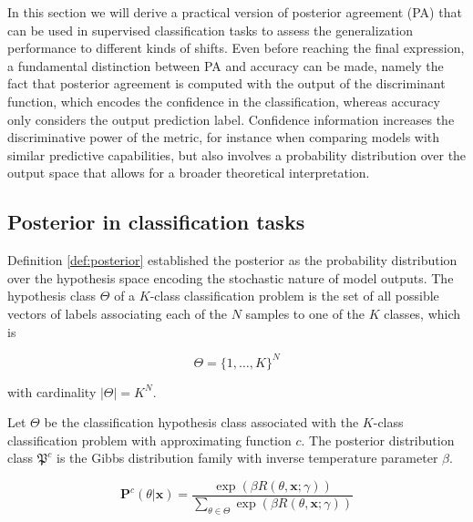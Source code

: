 In this section we will derive a practical version of posterior agreement (PA) that
can be used in supervised classification tasks to assess the generalization performance
to different kinds of shifts. Even before reaching the final expression, a 
fundamental distinction between PA and accuracy can be made, namely the fact
that posterior agreement is computed with the output of the discriminant function,
which encodes the confidence in the classification, whereas accuracy only
considers the output prediction label. Confidence information increases 
the discriminative power of the metric, for instance when
comparing models with similar predictive capabilities, but also involves a probability
distribution over the output space that allows for a broader theoretical
interpretation.

\subsection{Posterior in classification tasks}

Definition \ref{def:posterior} established the posterior as the probability
distribution over the hypothesis space encoding the stochastic nature of
model outputs. The hypothesis class $\Theta$ of a $K$-class classification problem is the set of
all possible vectors of labels associating each of the $N$ samples
to one of the $K$ classes, which is

$$
\Theta = \{1, \dots, K \}^N
$$

with cardinality $|\Theta| = K^N$.

\begin{theorem}
    Let $\Theta$ be the classification hypothesis class associated with the 
    $K$-class classification problem with approximating function $c$.
    The posterior distribution class $\mathfrak{P}^c$ is the Gibbs
    distribution family with inverse temperature parameter $\beta$.

    $$
        \mathbf{P}^c (\theta | \bm{x}) = \frac{\exp \left ( \beta R(\theta, \bm{x}; \gamma) \right )}{\sum_{\theta \in \Theta} \exp \left ( \beta R(\theta, \bm{x}; \gamma) \right )} 
    $$
\end{theorem}

